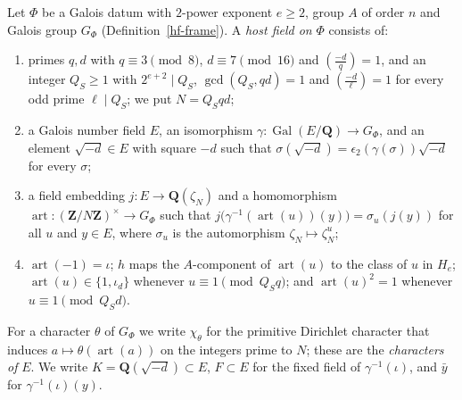 \begin{definition}\label{hf-framed-host-field}
Let $\Phi$ be a Galois datum with $2$-power exponent $e\geq2$, group $A$ of order $n$ and Galois group
$G_\Phi$ (Definition~\ref{hf-frame}). A \emph{host field on} $\Phi$ consists of:
\begin{enumerate}
\item primes $q,d$ with $q\equiv3\pmod8$, $d\equiv7\pmod{16}$ and
  $\left(\frac{-d}{q}\right)=1$, and an integer $Q_S\geq1$ with $2^{e+2}\mid Q_S$,
  $\gcd(Q_S,qd)=1$ and $\left(\frac{-d}{\ell}\right)=1$ for every odd prime $\ell\mid Q_S$; we
  put $N=Q_Sqd$;
\item a Galois number field $E$, an isomorphism $\gamma\colon\operatorname{Gal}(E/\mathbf Q)\to
  G_\Phi$, and an element $\sqrt{-d}\in E$ with square $-d$ such that
  $\sigma(\sqrt{-d})=\epsilon_2(\gamma(\sigma))\sqrt{-d}$ for every $\sigma$;
\item a field embedding $j\colon E\to\mathbf Q(\zeta_N)$ and a homomorphism
  $\operatorname{art}\colon(\mathbf Z/N\mathbf Z)^\times\to G_\Phi$ such that
  $j\bigl(\gamma^{-1}(\operatorname{art}(u))(y)\bigr)=\sigma_u(j(y))$ for all $u$ and $y\in E$,
  where $\sigma_u$ is the automorphism $\zeta_N\mapsto\zeta_N^u$;
\item $\operatorname{art}(-1)=\iota$; $h$ maps the $A$-component of $\operatorname{art}(u)$ to the
  class of $u$ in $H_e$; $\operatorname{art}(u)\in\{1,\iota_d\}$ whenever $u\equiv1\pmod{Q_Sq}$;
  and $\operatorname{art}(u)^2=1$ whenever $u\equiv1\pmod{Q_Sd}$.
\end{enumerate}
For a character $\theta$ of $G_\Phi$ we write $\chi_\theta$ for the primitive Dirichlet character
that induces $a\mapsto\theta(\operatorname{art}(a))$ on the integers prime to $N$; these are the
\emph{characters of} $E$. We write $K=\mathbf Q(\sqrt{-d})\subset E$, $F\subset E$ for the fixed field
of $\gamma^{-1}(\iota)$, and $\bar y$ for $\gamma^{-1}(\iota)(y)$.
\end{definition}

